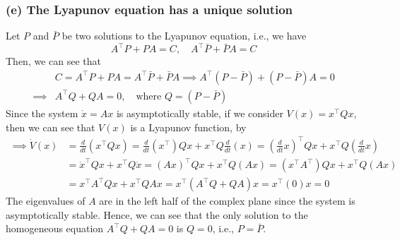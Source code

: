 \subsubsection*{(e) The Lyapunov equation has a unique solution}

Let \( P \) and \( \bar{P} \) be two solutions to the Lyapunov equation, i.e., we have
\begin{equation*}
    A^\top P + P A = C,
    \quad
    A^\top \bar{P} + \bar{P} A = C
\end{equation*}
Then, we can see that
\begin{align*}
     &
    C
    =
    A^\top P + P A
    =
    A^\top \bar{P} + \bar{P} A
    \implies
    A^\top (P - \bar{P}) + (P - \bar{P}) A
    =
    0
    \\
    \implies
     &
    A^\top Q + Q A
    =
    0,
    \quad \text{where } Q = (P - \bar{P})
\end{align*}
Since the system \( \dot x = A x \) is asymptotically stable, if we consider \( V(x) = x^\top Q x \), then we can see that \( V(x) \) is a Lyapunov function, by
\begin{align*}
    \implies
    \dot V(x)
     & =
    \frac{d}{dt} \left( x^\top Q x \right)
    =
    \frac{d}{dt} \left( x^\top \right) Q x + x^\top Q \frac{d}{dt} \left( x \right)
    =
    {\left(\frac{d}{dt} x \right)}^\top Q x + x^\top Q {\left(\frac{d}{dt} x \right)}
    \\ & =
    {\dot x}^\top Q x + x^\top Q \dot x
    =
    {\left( A x \right)}^\top Q x + x^\top Q \left( A x \right)
    =
    \left( x^\top A^\top \right) Q x + x^\top Q \left( A x \right)
    \\ & =
    x^\top A^\top Q x + x^\top Q A x
    =
    x^\top \left( A^\top Q + Q A \right) x
    =
    x^\top \left( 0 \right) x
    =
    0
\end{align*}
The eigenvalues of \( A \) are in the left half of the complex plane since the system is asymptotically stable.
Hence, we can see that the only solution to the homogeneous equation \( A^\top Q + Q A = 0 \) is \( Q = 0 \), i.e., \( \boxed{P = \bar{P}} \).
